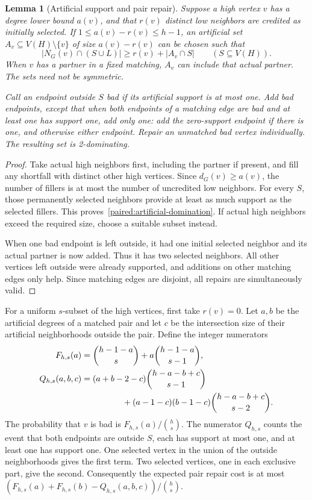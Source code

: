 \documentclass[11pt,a4paper]{article}
\newtheorem{lemma}[theorem]{Lemma}
\theoremstyle{definition}\newtheorem{definition}[theorem]{Definition}
\theoremstyle{remark}\newtheorem{remark}[theorem]{Remark}
\begin{document}
\begin{lemma}[Artificial support and pair repair]\label{paired:artificial}
Suppose a high vertex $v$ has a degree lower bound $a(v)$, and that
$r(v)$ distinct low neighbors are credited as initially selected.
If $1\le a(v)-r(v)\le h-1$, an artificial set
$A_v\subseteq V(H)\setminus\{v\}$ of size $a(v)-r(v)$ can be chosen
such that
\begin{equation}\label{paired:artificial-domination}
 |N_G(v)\cap(S\cup L)|\ge r(v)+|A_v\cap S|
 \qquad(S\subseteq V(H)).
\end{equation}
When $v$ has a partner in a fixed matching, $A_v$ can include that
actual partner. The sets need not be symmetric.

Call an endpoint outside $S$ bad if its artificial support is at most
one. Add bad endpoints, except that when both endpoints of a matching
edge are bad and at least one has support one, add only one: add the
zero-support endpoint if there is one, and otherwise either endpoint.
Repair an unmatched bad vertex individually. The resulting set is
2-dominating.
\end{lemma}
\begin{proof}
Take actual high neighbors first, including the partner if present,
and fill any shortfall with distinct other high vertices. Since
$d_G(v)\ge a(v)$, the number of fillers is at most the number of
uncredited low neighbors. For every $S$, those permanently selected
neighbors provide at least as much support as the selected fillers.
This proves~\eqref{paired:artificial-domination}. If actual high
neighbors exceed the required size, choose a suitable subset instead.

When one bad endpoint is left outside, it had one initial selected
neighbor and its actual partner is now added. Thus it has two
selected neighbors. All other vertices left outside were already
supported, and additions on other matching edges only help. Since
matching edges are disjoint, all repairs are simultaneously valid.
\end{proof}

For a uniform $s$-subset of the high vertices, first take $r(v)=0$.
Let $a,b$ be the artificial degrees of a matched pair and let $c$ be
the intersection size of their artificial neighborhoods outside the
pair. Define the integer numerators
\begin{align}
 F_{h,s}(a)&=\binom{h-1-a}{s}+a\binom{h-1-a}{s-1},
       \label{paired:F-uniform}\\
 Q_{h,s}(a,b,c)&=(a+b-2-c)\binom{h-a-b+c}{s-1}\notag\\
 &\hspace{17mm}+(a-1-c)(b-1-c)\binom{h-a-b+c}{s-2}.
       \label{paired:Q-uniform}
\end{align}
The probability that $v$ is bad is $F_{h,s}(a)/\binom hs$. The
numerator $Q_{h,s}$ counts the event that both endpoints are outside
$S$, each has support at most one, and at least one has support one.
One selected vertex in the union of the outside neighborhoods gives
the first term. Two selected vertices, one in each exclusive part,
give the second. Consequently the expected pair repair cost is at
most $(F_{h,s}(a)+F_{h,s}(b)-Q_{h,s}(a,b,c))/\binom hs$.
\end{document}
